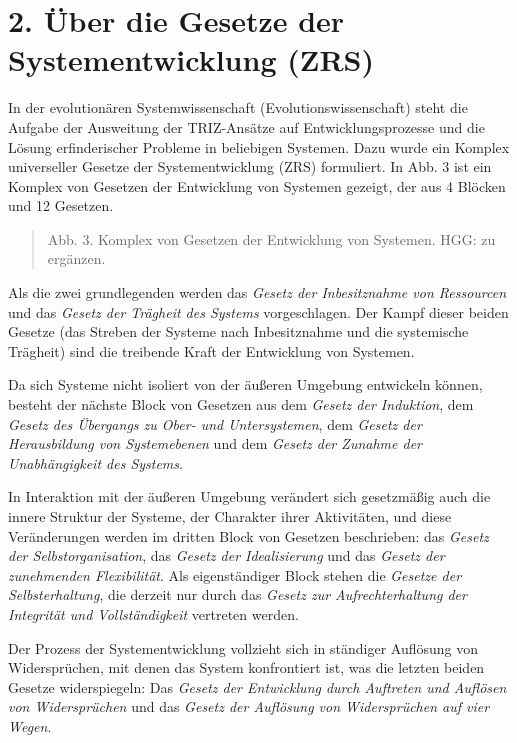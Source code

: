\documentclass[11pt,a4paper]{article}
\begin{document}
\section*{2. Über die Gesetze der Systementwicklung (ZRS)}
In der evolutionären Systemwissenschaft (Evolutionswissenschaft) steht die
Aufgabe der Ausweitung der TRIZ-Ansätze auf Entwicklungsprozesse und die
Lösung erfinderischer Probleme in beliebigen Systemen. Dazu wurde ein Komplex
universeller Gesetze der Systementwicklung (ZRS) formuliert. In Abb. 3 ist ein
Komplex von Gesetzen der Entwicklung von Systemen gezeigt, der aus 4 Blöcken
und 12 Gesetzen.
\begin{quote}
  Abb. 3. Komplex von Gesetzen der Entwicklung von Systemen. HGG: zu ergänzen.
\end{quote}
Als die zwei grundlegenden werden das \emph{Gesetz der Inbesitznahme von
  Ressourcen} und das \emph{Gesetz der Trägheit des Systems} vorgeschlagen.
Der Kampf dieser beiden Gesetze (das Streben der Systeme nach Inbesitznahme
und die systemische Trägheit) sind die treibende Kraft der Entwicklung von
Systemen.

Da sich Systeme nicht isoliert von der äußeren Umgebung entwickeln können,
besteht der nächste Block von Gesetzen aus dem \emph{Gesetz der Induktion},
dem \emph{Gesetz des Übergangs zu Ober- und Untersystemen}, dem \emph{Gesetz
  der Herausbildung von Systemebenen} und dem \emph{Gesetz der Zunahme der
  Unabhängigkeit des Systems}.

In Interaktion mit der äußeren Umgebung verändert sich gesetzmäßig auch die
innere Struktur der Systeme, der Charakter ihrer Aktivitäten, und diese
Veränderungen werden im dritten Block von Gesetzen beschrieben: das
\emph{Gesetz der Selbstorganisation}, das \emph{Gesetz der Idealisierung} und
das \emph{Gesetz der zunehmenden Flexibilität}.  Als eigenständiger Block
stehen die \emph{Gesetze der Selbsterhaltung}, die derzeit nur durch das
\emph{Gesetz zur Aufrechterhaltung der Integrität und Vollständigkeit}
vertreten werden.

Der Prozess der Systementwicklung vollzieht sich in ständiger Auflösung von
Widersprüchen, mit denen das System konfrontiert ist, was die letzten beiden
Gesetze widerspiegeln: Das \emph{Gesetz der Entwicklung durch Auftreten und
  Auflösen von Widersprüchen} und das \emph{Gesetz der Auflösung von
  Widersprüchen auf vier Wegen}.
\end{document}
